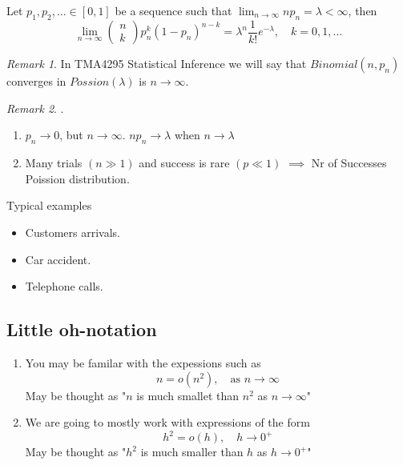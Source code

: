 \documentclass{article}
\theoremstyle{remark}
\newtheorem*{remark}{Remark}
\begin{document}
\begin{theorem}
  Let $p_{1}, p_{2}, \ldots \in  \left[ 0,1 \right]$ be a sequence such that $\lim_{n \to  \infty} n p_{n} = \lambda  < \infty $, then \[
  \lim_{n\to \infty}  \begin{pmatrix}
  n \\
  k
  \end{pmatrix} 
  p^{k}_{n} \left( 1-p_{n} \right) ^{n-k} = \lambda ^{n} \frac{1}{k!}  e^{-\lambda } , \quad  k=0,1 , \ldots 
  \] 
\end{theorem}
\begin{remark}
  In TMA4295 Statistical Inference we will say that $Binomial\left( n, p_{n} \right)$ converges in $Possion\left( \lambda  \right)$ is $n\to \infty$.
\end{remark}
 
\begin{remark}
  .
  \begin{enumerate}[label=(\roman*)]
    \item $p_{n } \to  0$, but $n\to \infty$. $np_{n} \to  \lambda $ when $n\to \lambda $
    \item Many trials $\left( n\gg 1 \right) $ and success is rare $\left( p \ll  1 \right)$ $\implies$  Nr of Successes Poission distribution.
  \end{enumerate}
\end{remark}

Typical examples 
\begin{itemize}
  \item Customers arrivals.
  \item Car accident.
  \item Telephone calls.
\end{itemize}


\subsection{Little oh-notation}%

\label{sub:little_oh_notation}


\begin{enumerate}[label=(\roman*)]
  \item
You may be familar with the expessions such as \[
n = o\left( n^2 \right), \quad \text{as } n\to \infty 
\] 
May be thought as  "$n$ is much smallet than $n^2$ as $n\to  \infty$"
\item 
We are going to mostly work with expressions of the form \[
h^2 = o\left( h \right) , \quad  h \to  0^{+} 
\] 
May be thought as "$h^2$ is much smaller than $h$ as $h \to  0^{+}$"

\end{enumerate}
\end{document}
